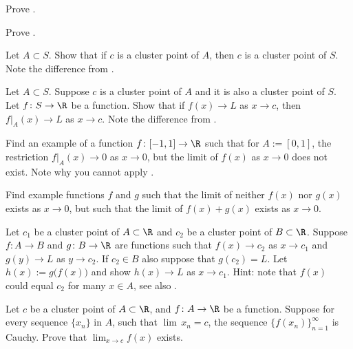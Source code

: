 \documentclass[12pt]{book}
\begin{document}
\begin{exercise}
Prove .
\end{exercise}

\begin{exercise}
Prove .
\end{exercise}

\begin{exercise}
Let $A \subset S$.
Show that if $c$ is a cluster point of $A$, then $c$
is a cluster point of $S$.
Note the difference from
.
\end{exercise}

\begin{exercise} \label{exercise:restrictionlimitexercise}
Let $A \subset S$.
Suppose $c$ is a cluster point of $A$ and
it is also a cluster point of $S$.
Let $f \colon S \to \R$ be a function.
Show that if
$f(x) \to L$ as $x \to c$, then
$f|_A(x) \to L$ as $x \to c$.
Note the difference from
.
\end{exercise}

\begin{exercise}
Find an example of a function $f \colon [-1,1] \to \R$ such that
for $A:=[0,1]$, the restriction
$f|_A(x) \to 0$ as $x \to 0$, but the limit of $f(x)$ as $x \to 0$
does not exist.
Note why you cannot apply
.
\end{exercise}

\begin{exercise}
Find example functions $f$ and $g$ such that the limit of neither $f(x)$
nor $g(x)$ exists as $x \to 0$, but such that the limit of $f(x)+g(x)$ exists
as $x \to 0$.
\end{exercise}

\begin{exercise} \label{exercise:contlimitcomposition}
Let $c_1$ be a cluster point of $A \subset \R$ and $c_2$ be
a cluster point of $B \subset \R$.
Suppose 
$f \colon A \to B$ and $g \colon B \to \R$ are functions
such that
$f(x) \to c_2$ as $x \to c_1$ and
$g(y) \to L$ as $y \to c_2$.
If $c_2 \in B$ also suppose that $g(c_2) = L$.
Let $h(x) := g\bigl(f(x)\bigr)$ and show
$h(x) \to L$ as $x \to c_1$.
Hint: note that $f(x)$ could equal $c_2$ for many $x \in A$,
see also
.
\end{exercise}

\begin{exercise}
Let $c$ be a cluster point of $A \subset \R$, and $f \colon A \to \R$
be a function.
Suppose for every sequence $\{x_n\}$ in $A$,
such that $\lim\, x_n = c$,
the sequence $\{ f(x_n) \}_{n=1}^\infty$ is Cauchy.
Prove that
$\lim_{x\to c} f(x)$ exists.
\end{exercise}
\end{document}
